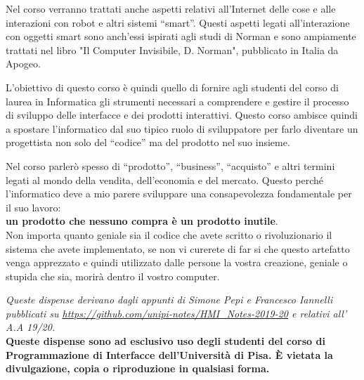 Nel corso verranno trattati anche aspetti relativi all'Internet delle cose e alle interazioni con robot e altri sistemi ``smart''. Questi aspetti legati all'interazione con oggetti smart sono anch'essi ispirati agli studi di Norman e sono ampiamente trattati nel libro "Il Computer Invisibile, D. Norman", pubblicato in Italia da Apogeo.

L'obiettivo di questo corso è quindi quello di fornire agli studenti del corso di laurea in Informatica gli strumenti necessari a comprendere e gestire il processo di sviluppo delle interfacce e dei prodotti interattivi. Questo corso ambisce quindi a spostare l'informatico dal suo tipico ruolo di sviluppatore per farlo diventare un progettista non solo del ``codice'' ma del prodotto nel suo insieme.

Nel corso parlerò spesso di ``prodotto'', ``business'', ``acquisto'' e altri termini legati al mondo della vendita, dell'economia e del mercato. Questo perché l'informatico deve a mio parere sviluppare una consapevolezza fondamentale per il suo lavoro:\\

\textbf{un prodotto che nessuno compra è un prodotto inutile}. \\

Non importa quanto geniale sia il codice che avete scritto o rivoluzionario il sistema che avete implementato, se non vi curerete di far si che questo artefatto venga apprezzato e quindi utilizzato dalle persone la vostra creazione, geniale o stupida che sia, morirà dentro il vostro computer.


\textit{Queste dispense derivano dagli appunti di Simone Pepi e Francesco Iannelli pubblicati su \url{https://github.com/unipi-notes/HMI_Notes-2019-20} e relativi all' A.A 19/20.}\\

\textbf{Queste dispense sono ad esclusivo uso degli studenti del corso di Programmazione di Interfacce dell'Università di Pisa. È vietata la divulgazione, copia o riproduzione in qualsiasi forma.}
